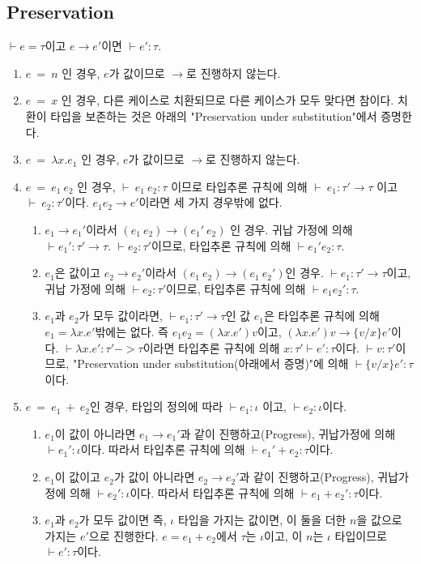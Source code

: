 \documentclass[a4paper]{article}
\begin{document}
\subsection*{Preservation}
$\vdash e = \tau$이고 $e \rightarrow e'$이면 $\vdash e' : \tau$.
\begin{enumerate}
	\item $e\ =\ n$ 인 경우, $e$가 값이므로 $\rightarrow$로 진행하지 않는다.
	\item $e\ =\ x$ 인 경우, 다른 케이스로 치환되므로 다른 케이스가 모두 맞다면 참이다. 치환이 타입을 보존하는 것은 아래의 "Preservation under substitution"에서 증명한다.
	\item $e\ =\ \lambda x.e_1$ 인 경우, $e$가 값이므로  $\rightarrow$로 진행하지 않는다.
	\item $e\ =\ {e}_{1}\ {e}_{2}$ 인 경우, $\vdash\ {e}_{1}\ {e}_{2}: \tau$ 이므로  타입추론 규칙에 의해 $\vdash\ {e}_{1}: \tau' \rightarrow \tau$ 이고 $\vdash\ {e}_{2}: \tau'$이다. ${e}_{1} {e}_{2} \rightarrow e'$이라면 세 가지 경우밖에 없다. 
	\begin{enumerate}
		\item ${e}_{1} \rightarrow {e}_{1}'$이라서  $({e}_{1}\ {e}_{2}) \rightarrow ({e}_{1}'\ {e}_{2})$ 인 경우. 귀납 가정에 의해 $\vdash {e}_{1}':\tau' \rightarrow \tau$. $\vdash {e}_{2}: \tau'$이므로, 타입추론 규칙에 의해 $\vdash {e}_{1}'{e}_{2}:\tau$. 
		\item ${e}_{1}$은 값이고 ${e}_{2} \rightarrow {e}_{2}'$이라서 $({e}_{1}\ {e}_{2}) \rightarrow ({e}_{1}\ {e}_{2}')$인 경우. $\vdash {e}_{1} : \tau' \rightarrow \tau$이고, 귀납 가정에 의해 $\vdash {e}_{2} : \tau'$이므로, 타입추론 규칙에 의해 $\vdash {e}_{1} {e}_{2}' : \tau$.
		\item ${e}_{1}$과 ${e}_{2}$가 모두 값이라면, $\vdash {e}_{1} : \tau' \rightarrow \tau$인 값 ${e}_{1}$은 타입추론 규칙에 의해 ${e}_{1} = \lambda x.e'$밖에는 없다. 즉 $e_1 e_2 = (\lambda x.e') v$이고, $(\lambda x.e') v \rightarrow \{v/x\}e'$이다. $\vdash \lambda x.e' : \tau' ->\tau$이라면 타입추론 규칙에 의해 $x : \tau' \vdash e' : \tau$이다. $\vdash v:\tau'$이므로, "Preservation under substitution(아래에서 증명)"에 의해 $\vdash \{v/x\}e' : \tau$이다.
	\end{enumerate}
	\item $e\ =\ e_1\ +\ e_2$인 경우, 타입의 정의에 따라 $\vdash e_1 : \iota$ 이고, $\vdash e_2 : \iota$이다.
	\begin{enumerate}
		\item $e_1$이 값이 아니라면 $e_1 \rightarrow e_1'$과 같이 진행하고(Progress), 귀납가정에 의해 $\vdash e_1' : \iota$이다. 따라서 타입추론 규칙에 의해 $\vdash e_1' + e_2 : \tau$이다.
		\item $e_1$이 값이고 $e_2$가 값이 아니라면 ${e}_{2} \rightarrow {e}_{2}'$과 같이 진행하고(Progress), 귀납가정에 의해 $\vdash e_2' : \iota$이다. 따라서 타입추론 규칙에 의해 $\vdash e_1 + e_2' : \tau$이다.
		\item ${e}_{1}$과 ${e}_{2}$가 모두 값이면 즉, $\iota$ 타입을 가지는 값이면, 이 둘을 더한 $n$을 값으로 가지는 $e'$으로 진행한다. $e = e_1 + e_2$에서 $\tau$는 $\iota$이고, 이 $n$는 $\iota$ 타입이므로 $\vdash e' : \tau$이다.
	\end{enumerate}
\end{enumerate}
\end{document}

